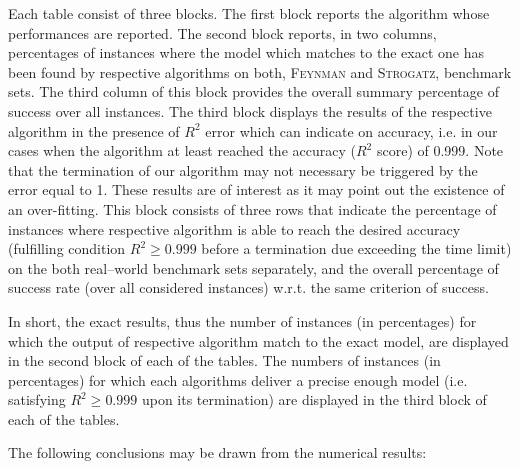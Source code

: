 \documentclass[a4paper,12pt]{elsarticle}
\begin{document}
Each table consist of three blocks. The first block reports the algorithm whose performances are reported. The second block reports, in two columns,  percentages of instances where the model which matches to the exact one has been found by respective algorithms on both, \textsc{Feynman} and \textsc{Strogatz}, benchmark sets. The third column of this block provides the overall summary percentage of success over all instances. The third block displays the results of the respective algorithm in the presence of $R^2$ error which can indicate on  accuracy, i.e. in our cases when the algorithm  at least reached the accuracy ($R^2$ score) of 0.999.  Note that the termination of our algorithm may not necessary be triggered by the error equal to 1. These results are of interest as it may point out the existence of an over-fitting. This block consists of three rows that indicate the percentage of instances where respective algorithm is able to reach the desired accuracy (fulfilling condition $R^2 \geq 0.999$ before a termination due exceeding the time limit) on the both real--world benchmark sets separately, and the overall percentage of success rate (over all considered instances) w.r.t. the same criterion of success.


In short, the exact results, thus the number of instances (in percentages) for which the output of respective algorithm match to the exact model, are displayed in the second block of each of the tables. The numbers of instances (in percentages) for which each algorithms deliver a precise enough model (i.e. satisfying $R^2\geq 0.999$ upon its termination) are displayed in the third block of each of the tables. 

The following conclusions may be drawn from the numerical results: 
\end{document}
